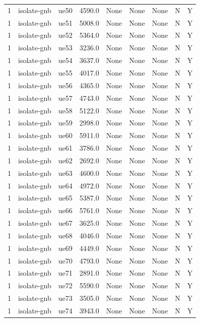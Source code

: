 \begin{table}[ht]
\begin{tabular}{|c|c|c|c|c|c|c|c|c|}
1 & isolate-gnb & ue50 & 4590.0 & None & None & None & N & Y \\
1 & isolate-gnb & ue51 & 5008.0 & None & None & None & N & Y \\
1 & isolate-gnb & ue52 & 5364.0 & None & None & None & N & Y \\
1 & isolate-gnb & ue53 & 3236.0 & None & None & None & N & Y \\
1 & isolate-gnb & ue54 & 3637.0 & None & None & None & N & Y \\
1 & isolate-gnb & ue55 & 4017.0 & None & None & None & N & Y \\
1 & isolate-gnb & ue56 & 4365.0 & None & None & None & N & Y \\
1 & isolate-gnb & ue57 & 4743.0 & None & None & None & N & Y \\
1 & isolate-gnb & ue58 & 5122.0 & None & None & None & N & Y \\
1 & isolate-gnb & ue59 & 2998.0 & None & None & None & N & Y \\
1 & isolate-gnb & ue60 & 5911.0 & None & None & None & N & Y \\
1 & isolate-gnb & ue61 & 3786.0 & None & None & None & N & Y \\
1 & isolate-gnb & ue62 & 2692.0 & None & None & None & N & Y \\
1 & isolate-gnb & ue63 & 4600.0 & None & None & None & N & Y \\
1 & isolate-gnb & ue64 & 4972.0 & None & None & None & N & Y \\
1 & isolate-gnb & ue65 & 5387.0 & None & None & None & N & Y \\
1 & isolate-gnb & ue66 & 5761.0 & None & None & None & N & Y \\
1 & isolate-gnb & ue67 & 3625.0 & None & None & None & N & Y \\
1 & isolate-gnb & ue68 & 4046.0 & None & None & None & N & Y \\
1 & isolate-gnb & ue69 & 4449.0 & None & None & None & N & Y \\
1 & isolate-gnb & ue70 & 4793.0 & None & None & None & N & Y \\
1 & isolate-gnb & ue71 & 2891.0 & None & None & None & N & Y \\
1 & isolate-gnb & ue72 & 5590.0 & None & None & None & N & Y \\
1 & isolate-gnb & ue73 & 3505.0 & None & None & None & N & Y \\
1 & isolate-gnb & ue74 & 3943.0 & None & None & None & N & Y \\

\end{tabular}
\end{table}
